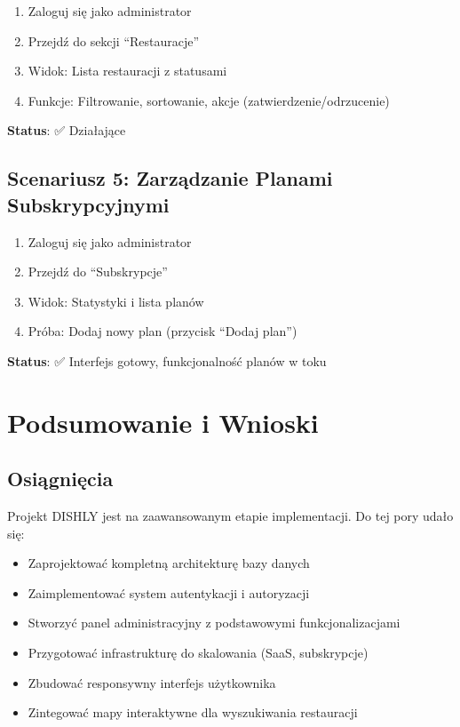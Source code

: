 \documentclass[12pt,a4paper,utf-8]{article}
\begin{document}
\begin{enumerate}
    \item Zaloguj się jako administrator
    \item Przejdź do sekcji ``Restauracje''
    \item Widok: Lista restauracji z statusami
    \item Funkcje: Filtrowanie, sortowanie, akcje (zatwierdzenie/odrzucenie)
\end{enumerate}

\textbf{Status}: ✅ Działające

\subsection{Scenariusz 5: Zarządzanie Planami Subskrypcyjnymi}

\begin{enumerate}
    \item Zaloguj się jako administrator
    \item Przejdź do ``Subskrypcje''
    \item Widok: Statystyki i lista planów
    \item Próba: Dodaj nowy plan (przycisk ``Dodaj plan'')
\end{enumerate}

\textbf{Status}: ✅ Interfejs gotowy, funkcjonalność planów w toku

\newpage

\section{Podsumowanie i Wnioski}

\subsection{Osiągnięcia}

Projekt DISHLY jest na zaawansowanym etapie implementacji. Do tej pory udało się:

\begin{itemize}
    \item Zaprojektować kompletną architekturę bazy danych
    \item Zaimplementować system autentykacji i autoryzacji
    \item Stworzyć panel administracyjny z podstawowymi funkcjonalizacjami
    \item Przygotować infrastrukturę do skalowania (SaaS, subskrypcje)
    \item Zbudować responsywny interfejs użytkownika
    \item Zintegować mapy interaktywne dla wyszukiwania restauracji
\end{itemize}
\end{document}
